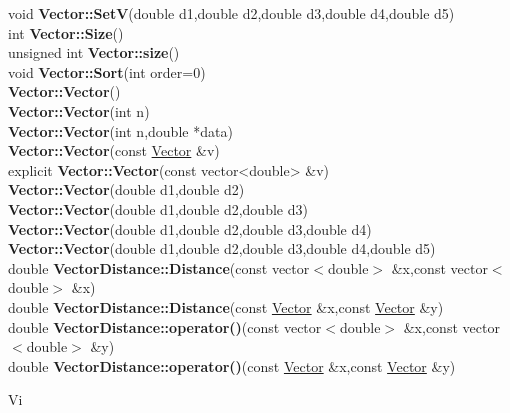 \documentclass[10pt,titlepage]{article}
\def\functionlistentry#1#2#3#4#5#6{\noindent #1 {\bf #2}(#3) \dotfill #6\\}
\def\letterref#1{}
\def\letterlabel#1{\vspace{0.5cm}\centerline{\Large #1}}
\begin{document}
{{\functionlistentry{void}{Vector::SetV}{double d1,double d2,double d3,double d4,double d5}{244}{datastructures}{}
\functionlistentry{int}{Vector::Size}{}{234}{datastructures}{}
\functionlistentry{unsigned int}{Vector::size}{}{235}{datastructures}{}
\functionlistentry{void}{Vector::Sort}{int order=0}{252}{datastructures}{}
\functionlistentry{}{Vector::Vector}{}{224}{datastructures}{}
\functionlistentry{}{Vector::Vector}{int n}{225}{datastructures}{}
\functionlistentry{}{Vector::Vector}{int n,double *data}{226}{datastructures}{}
\functionlistentry{}{Vector::Vector}{const \hyperlink{Vector}{Vector} \&v}{227}{datastructures}{}
\functionlistentry{explicit}{Vector::Vector}{const vector<double> \&v}{228}{datastructures}{}
\functionlistentry{}{Vector::Vector}{double d1,double d2}{229}{datastructures}{}
\functionlistentry{}{Vector::Vector}{double d1,double d2,double d3}{230}{datastructures}{}
\functionlistentry{}{Vector::Vector}{double d1,double d2,double d3,double d4}{231}{datastructures}{}
\functionlistentry{}{Vector::Vector}{double d1,double d2,double d3,double d4,double d5}{232}{datastructures}{}
\functionlistentry{double}{VectorDistance::Distance}{const vector$<$double$>$ \&x,const vector$<$double$>$ \&x}{1234}{features}{}
\functionlistentry{double}{VectorDistance::Distance}{const \hyperlink{Vector}{Vector} \&x,const \hyperlink{Vector}{Vector} \&y}{1235}{features}{}
\functionlistentry{double}{VectorDistance::operator()}{const vector$<$double$>$ \&x,const vector$<$double$>$ \&y}{1236}{features}{}
\functionlistentry{double}{VectorDistance::operator()}{const \hyperlink{Vector}{Vector} \&x,const \hyperlink{Vector}{Vector} \&y}{1237}{features}{}

\letterlabel{Vi}
\letterref{A}
\letterref{B}
\letterref{C}
\letterref{D}
\letterref{E}
\letterref{F}
\letterref{G}
\letterref{H}
\letterref{I}
\letterref{K}
\letterref{L}
\letterref{M}
\letterref{N}
\letterref{O}
\letterref{P}
\letterref{Q}
\letterref{R}
\letterref{S}
\letterref{T}
\letterref{U}
\letterref{V}
\letterref{W}
\letterref{X}
\letterref{Y}
\letterref{Z}

}}
\end{document}

